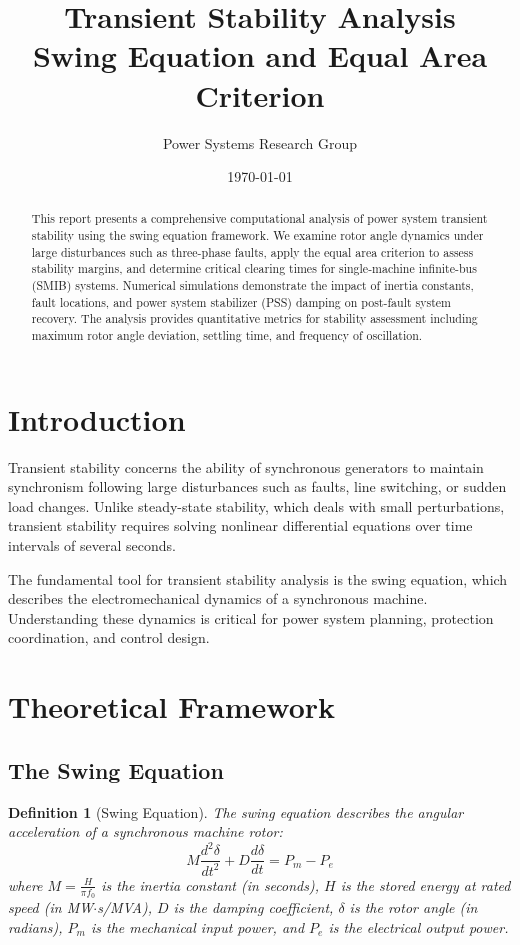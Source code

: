 \documentclass[11pt,a4paper]{article}
\title{Transient Stability Analysis\\Swing Equation and Equal Area Criterion}
\author{Power Systems Research Group}
\date{\today}
\newtheorem{definition}{Definition}[section]
\begin{document}
\maketitle

\begin{abstract}
This report presents a comprehensive computational analysis of power system transient stability using the swing equation framework. We examine rotor angle dynamics under large disturbances such as three-phase faults, apply the equal area criterion to assess stability margins, and determine critical clearing times for single-machine infinite-bus (SMIB) systems. Numerical simulations demonstrate the impact of inertia constants, fault locations, and power system stabilizer (PSS) damping on post-fault system recovery. The analysis provides quantitative metrics for stability assessment including maximum rotor angle deviation, settling time, and frequency of oscillation.
\end{abstract}

\section{Introduction}

Transient stability concerns the ability of synchronous generators to maintain synchronism following large disturbances such as faults, line switching, or sudden load changes. Unlike steady-state stability, which deals with small perturbations, transient stability requires solving nonlinear differential equations over time intervals of several seconds.

The fundamental tool for transient stability analysis is the swing equation, which describes the electromechanical dynamics of a synchronous machine. Understanding these dynamics is critical for power system planning, protection coordination, and control design.

\section{Theoretical Framework}

\subsection{The Swing Equation}

\begin{definition}[Swing Equation]
The swing equation describes the angular acceleration of a synchronous machine rotor:
\begin{equation}
M \frac{d^2\delta}{dt^2} + D \frac{d\delta}{dt} = P_m - P_e
\end{equation}
where $M = \frac{H}{\pi f_0}$ is the inertia constant (in seconds), $H$ is the stored energy at rated speed (in MW$\cdot$s/MVA), $D$ is the damping coefficient, $\delta$ is the rotor angle (in radians), $P_m$ is the mechanical input power, and $P_e$ is the electrical output power.
\end{definition}
\end{document}

